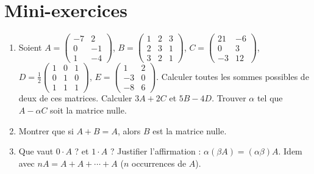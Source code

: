 \section{Mini-exercices}

\begin{frame}

\begin{miniexercice}
\begin{enumerate}
  \item Soient 
  $A=\left(\begin{smallmatrix}-7&2\\0&-1\\1&-4\end{smallmatrix}\right)$,
  $B=\left(\begin{smallmatrix}1&2&3\\2&3&1\\3&2&1\end{smallmatrix}\right)$,
  $C=\left(\begin{smallmatrix}21&-6\\0&3\\-3&12\end{smallmatrix}\right)$,
  $D=\frac12\left(\begin{smallmatrix}1&0&1\\0&1&0\\1&1&1\end{smallmatrix}\right)$,
  $E=\left(\begin{smallmatrix}1&2\\-3&0\\-8&6\end{smallmatrix}\right)$.   
  Calculer toutes les sommes possibles de deux de ces matrices. 
  Calculer $3A+2C$ et $5B-4D$. Trouver $\alpha$ tel que $A-\alpha C$ soit la matrice nulle.
  
  \item Montrer que si $A+B=A$, alors $B$ est la matrice nulle.
  
  \item Que vaut $0\cdot A$ ? et $1\cdot A$ ? Justifier l'affirmation : $\alpha(\beta A) = (\alpha\beta)A$.
  Idem avec $nA = A+A+\cdots+A$ ($n$ occurrences de $A$).
    
\end{enumerate}
\end{miniexercice}

\end{frame}

